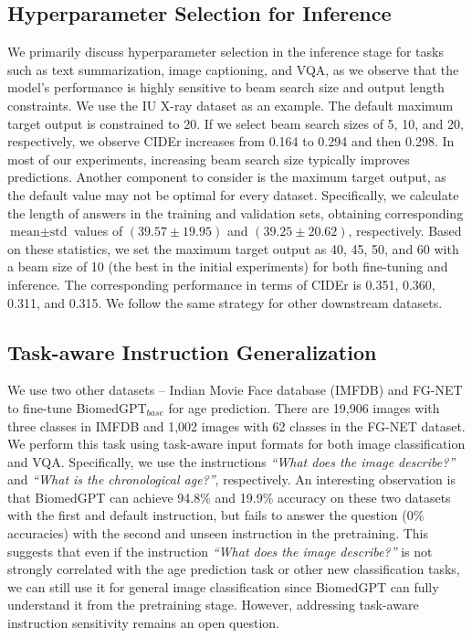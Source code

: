 \documentclass[10pt]{article} \usepackage[preprint]{tmlr}
\begin{document}
\subsection{Hyperparameter Selection for Inference} \label{sec:hyper_infer}

We primarily discuss hyperparameter selection in the inference stage for tasks such as text summarization, image captioning, and VQA, as we observe that the model's performance is highly sensitive to beam search size and output length constraints. We use the IU X-ray dataset as an example. The default maximum target output is constrained to 20. If we select beam search sizes of 5, 10, and 20, respectively, we observe CIDEr increases from 0.164 to 0.294 and then 0.298. In most of our experiments, increasing beam search size typically improves predictions. Another component to consider is the maximum target output, as the default value may not be optimal for every dataset. Specifically, we calculate the length of answers in the training and validation sets, obtaining corresponding $\text{mean} \pm \text{std}$ values of $(39.57 \pm 19.95)$ and $(39.25 \pm 20.62)$, respectively. Based on these statistics, we set the maximum target output as 40, 45, 50, and 60 with a beam size of 10 (the best in the initial experiments) for both fine-tuning and inference. The corresponding performance in terms of CIDEr is 0.351, 0.360, 0.311, and 0.315. We follow the same strategy for other downstream datasets.

\subsection{Task-aware Instruction Generalization} \label{appx:instruct_generalization}

We use two other datasets -- Indian Movie Face database (IMFDB) \citep{imfdb} and FG-NET \citep{lanitis2002toward} to fine-tune BiomedGPT$_{base}$ for age prediction. There are 19,906 images with three classes in IMFDB and 1,002 images with 62 classes in the FG-NET dataset. We perform this task using task-aware input formats for both image classification and VQA. Specifically, we use the instructions \textit{``What does the image describe?''} and \textit{``What is the chronological age?''}, respectively. An interesting observation is that BiomedGPT can achieve 94.8\% and 19.9\% accuracy on these two datasets with the first and default instruction, but fails to answer the question (0\% accuracies) with the second and unseen instruction in the pretraining. This suggests that even if the instruction \textit{``What does the image describe?''} is not strongly correlated with the age prediction task or other new classification tasks, we can still use it for general image classification since BiomedGPT can fully understand it from the pretraining stage. However, addressing task-aware instruction sensitivity remains an open question.
\end{document}
